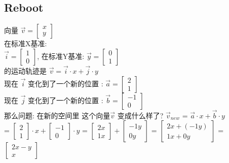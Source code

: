 \documentclass[12pt]{article}
\begin{document}
\begin{flushleft}
\section*{Reboot}
    向量 $\vec{v}  =  \begin{bmatrix}
    x \\ 
    y
\end{bmatrix}$ \\
在标准X基准: \\  
$\vec{i}  =  \begin{bmatrix}
    1 \\ 
    0
\end{bmatrix}$,
在标准Y基准:  
$\vec{y}  =  \begin{bmatrix}
    0 \\ 
    1
\end{bmatrix}$ \\

的运动轨迹是
$\vec{v} = \vec{i} \cdot x  +  \vec{j} \cdot y $ \\ 

现在 $\vec{i}$ 变化到了一个新的位置  : $\vec{a} = \begin{bmatrix}
    2\\
    1
\end{bmatrix}$ \\ 
现在 $\vec{j}$ 变化到了一个新的位置  : $\vec{b} = \begin{bmatrix}
    -1\\
    0
\end{bmatrix}$ \\ 


那么问题: 在新的空间里 这个向量$\vec{v}$ 变成什么样了?
$\vec{v}_{new}$
= $\vec{a} \cdot x  +  \vec{b} \cdot y $ \\ 
= $\begin{bmatrix}
    2 \\
    1
\end{bmatrix} \cdot x  +  \begin{bmatrix}
    -1 \\
    0
\end{bmatrix}  \cdot y$
=  $\begin{bmatrix}
    2x \\
    1x
\end{bmatrix} +  \begin{bmatrix}
    -1y \\
    0y
\end{bmatrix} $
= $\begin{bmatrix}
    2x + (-1y) \\ 
    1x + 0y 
\end{bmatrix}
$
= $\begin{bmatrix}
    2x - y \\
    x 
\end{bmatrix}$ \\


\end{flushleft}
\end{document}
